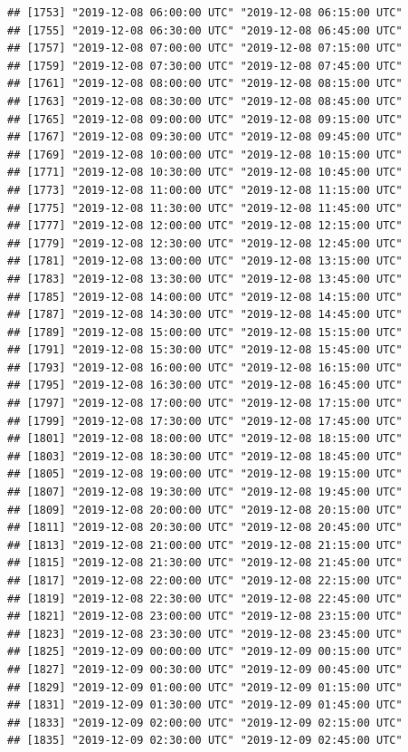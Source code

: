 \documentclass{article}\usepackage[]{graphicx}\usepackage[]{color}
\makeatletter
\newenvironment{kframe}{%
 \def\at@end@of@kframe{}%
 \ifinner\ifhmode%
  \def\at@end@of@kframe{\end{minipage}}%
  \begin{minipage}{\columnwidth}%
 \fi\fi%
 \def\FrameCommand##1{\hskip\@totalleftmargin \hskip-\fboxsep
 \colorbox{shadecolor}{##1}\hskip-\fboxsep
     \hskip-\linewidth \hskip-\@totalleftmargin \hskip\columnwidth}%
 \MakeFramed {\advance\hsize-\width
   \@totalleftmargin\z@ \linewidth\hsize
   \@setminipage}}%
 {\par\unskip\endMakeFramed%
 \at@end@of@kframe}
\newenvironment{knitrout}{}{} %
\makeatother
\begin{document}
\begin{knitrout}
\begin{kframe}
\begin{verbatim}
## [1753] "2019-12-08 06:00:00 UTC" "2019-12-08 06:15:00 UTC"
## [1755] "2019-12-08 06:30:00 UTC" "2019-12-08 06:45:00 UTC"
## [1757] "2019-12-08 07:00:00 UTC" "2019-12-08 07:15:00 UTC"
## [1759] "2019-12-08 07:30:00 UTC" "2019-12-08 07:45:00 UTC"
## [1761] "2019-12-08 08:00:00 UTC" "2019-12-08 08:15:00 UTC"
## [1763] "2019-12-08 08:30:00 UTC" "2019-12-08 08:45:00 UTC"
## [1765] "2019-12-08 09:00:00 UTC" "2019-12-08 09:15:00 UTC"
## [1767] "2019-12-08 09:30:00 UTC" "2019-12-08 09:45:00 UTC"
## [1769] "2019-12-08 10:00:00 UTC" "2019-12-08 10:15:00 UTC"
## [1771] "2019-12-08 10:30:00 UTC" "2019-12-08 10:45:00 UTC"
## [1773] "2019-12-08 11:00:00 UTC" "2019-12-08 11:15:00 UTC"
## [1775] "2019-12-08 11:30:00 UTC" "2019-12-08 11:45:00 UTC"
## [1777] "2019-12-08 12:00:00 UTC" "2019-12-08 12:15:00 UTC"
## [1779] "2019-12-08 12:30:00 UTC" "2019-12-08 12:45:00 UTC"
## [1781] "2019-12-08 13:00:00 UTC" "2019-12-08 13:15:00 UTC"
## [1783] "2019-12-08 13:30:00 UTC" "2019-12-08 13:45:00 UTC"
## [1785] "2019-12-08 14:00:00 UTC" "2019-12-08 14:15:00 UTC"
## [1787] "2019-12-08 14:30:00 UTC" "2019-12-08 14:45:00 UTC"
## [1789] "2019-12-08 15:00:00 UTC" "2019-12-08 15:15:00 UTC"
## [1791] "2019-12-08 15:30:00 UTC" "2019-12-08 15:45:00 UTC"
## [1793] "2019-12-08 16:00:00 UTC" "2019-12-08 16:15:00 UTC"
## [1795] "2019-12-08 16:30:00 UTC" "2019-12-08 16:45:00 UTC"
## [1797] "2019-12-08 17:00:00 UTC" "2019-12-08 17:15:00 UTC"
## [1799] "2019-12-08 17:30:00 UTC" "2019-12-08 17:45:00 UTC"
## [1801] "2019-12-08 18:00:00 UTC" "2019-12-08 18:15:00 UTC"
## [1803] "2019-12-08 18:30:00 UTC" "2019-12-08 18:45:00 UTC"
## [1805] "2019-12-08 19:00:00 UTC" "2019-12-08 19:15:00 UTC"
## [1807] "2019-12-08 19:30:00 UTC" "2019-12-08 19:45:00 UTC"
## [1809] "2019-12-08 20:00:00 UTC" "2019-12-08 20:15:00 UTC"
## [1811] "2019-12-08 20:30:00 UTC" "2019-12-08 20:45:00 UTC"
## [1813] "2019-12-08 21:00:00 UTC" "2019-12-08 21:15:00 UTC"
## [1815] "2019-12-08 21:30:00 UTC" "2019-12-08 21:45:00 UTC"
## [1817] "2019-12-08 22:00:00 UTC" "2019-12-08 22:15:00 UTC"
## [1819] "2019-12-08 22:30:00 UTC" "2019-12-08 22:45:00 UTC"
## [1821] "2019-12-08 23:00:00 UTC" "2019-12-08 23:15:00 UTC"
## [1823] "2019-12-08 23:30:00 UTC" "2019-12-08 23:45:00 UTC"
## [1825] "2019-12-09 00:00:00 UTC" "2019-12-09 00:15:00 UTC"
## [1827] "2019-12-09 00:30:00 UTC" "2019-12-09 00:45:00 UTC"
## [1829] "2019-12-09 01:00:00 UTC" "2019-12-09 01:15:00 UTC"
## [1831] "2019-12-09 01:30:00 UTC" "2019-12-09 01:45:00 UTC"
## [1833] "2019-12-09 02:00:00 UTC" "2019-12-09 02:15:00 UTC"
## [1835] "2019-12-09 02:30:00 UTC" "2019-12-09 02:45:00 UTC"

\end{verbatim}
\end{kframe}
\end{knitrout}
\end{document}
